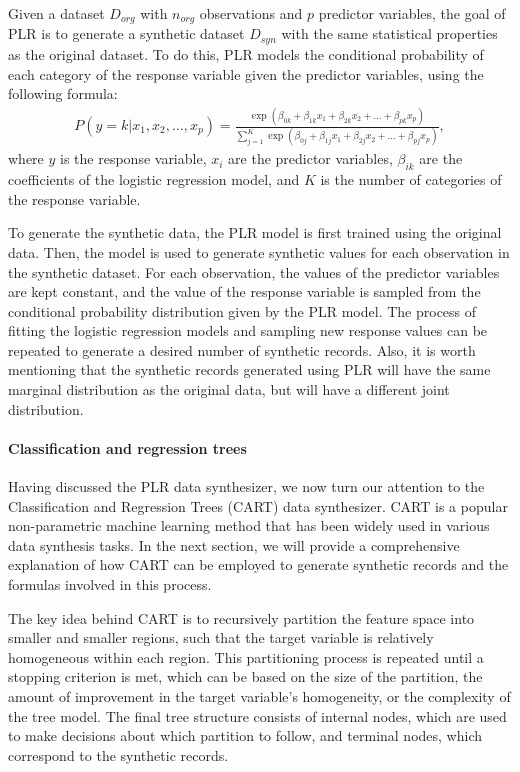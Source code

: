 Given a dataset $D_{org}$ with $n_{org}$ observations and $p$ predictor variables, the goal of PLR is to generate a synthetic dataset $D_{syn}$ with the same statistical properties as the original dataset. To do this, PLR models the conditional probability of each category of the response variable given the predictor variables, using the following formula:
\begin{align}
    \label{equ:multilogit}
    P(y=k|x_1,x_2,\dots,x_p)=\frac{\exp(\beta_{0k}+\beta_{1k}x_1+\beta_{2k}x_2+\dots + \beta_{pk}x_p)}{\sum_{j=1}^K\exp(\beta_{0j}+\beta_{1j}x_1+\beta_{2j}x_2+\dots + \beta_{pj}x_p)},
\end{align}
where $y$ is the response variable, $x_i$ are the predictor variables, $\beta_{ik}$ are the coefficients of the logistic regression model, and $K$ is the number of categories of the response variable.

To generate the synthetic data, the PLR model is first trained using the original data. Then, the model is used to generate synthetic values for each observation in the synthetic dataset. For each observation, the values of the predictor variables are kept constant, and the value of the response variable is sampled from the conditional probability distribution given by the PLR model. The process of fitting the logistic regression models and sampling new response values can be repeated to generate a desired number of synthetic records. Also, it is worth mentioning that the synthetic records generated using PLR will have the same marginal distribution as the original data, but will have a different joint distribution.


\paragraph{Classification and regression trees}
Having discussed the PLR data synthesizer, we now turn our attention to the Classification and Regression Trees (CART) data synthesizer. CART is a popular non-parametric machine learning method that has been widely used in various data synthesis tasks. In the next section, we will provide a comprehensive explanation of how CART can be employed to generate synthetic records and the formulas involved in this process.

The key idea behind CART is to recursively partition the feature space into smaller and smaller regions, such that the target variable is relatively homogeneous within each region. This partitioning process is repeated until a stopping criterion is met, which can be based on the size of the partition, the amount of improvement in the target variable's homogeneity, or the complexity of the tree model. The final tree structure consists of internal nodes, which are used to make decisions about which partition to follow, and terminal nodes, which correspond to the synthetic records.

